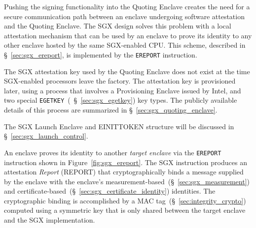 Pushing the signing functionality into the Quoting Enclave creates the need for
a secure communication path between an enclave undergoing software attestation
and the Quoting Enclave. The SGX design solves this problem with a local
attestation mechanism that can be used by an enclave to prove its identity to
any other enclave hosted by the same SGX-enabled CPU. This scheme, described in
\S~\ref{sec:sgx_ereport}, is implemented by the \texttt{EREPORT} instruction.


The SGX attestation key used by the Quoting Enclave does not exist at the time
SGX-enabled processors leave the factory. The attestation key is provisioned
later, using a process that involves a Provisioning Enclave issued by Intel,
and two special \texttt{EGETKEY}~(~\S~\ref{sec:sgx_egetkey}) key types. The
publicly available details of this process are summarized in
\S~\ref{sec:sgx_quoting_enclave}.

The SGX Launch Enclave and EINITTOKEN structure will be discussed in
\S~\ref{sec:sgx_launch_control}.

\label{sec:sgx_ereport}


An enclave proves its identity to another \textit{target enclave} via the
\texttt{EREPORT} instruction shown in Figure~\ref{fig:sgx_ereport}. The SGX
instruction produces an attestation \textit{Report} (REPORT) that
cryptographically binds a message supplied by the enclave with the enclave's
measurement-based~(\S~\ref{sec:sgx_measurement}) and
certificate-based~(\S~\ref{sec:sgx_certificate_identity}) identities. The
cryptographic binding is accomplished by a MAC
tag~(\S~\ref{sec:integrity_crypto}) computed using a symmetric key that is only
shared between the target enclave and the SGX implementation.

